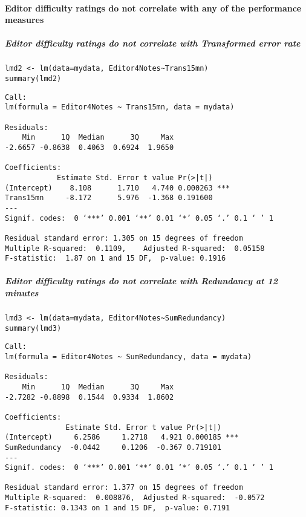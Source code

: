 \documentclass[10pt]{article}
\begin{document}
\paragraph*{Editor difficulty ratings do not correlate with any of the performance measures}
\label{sec-2-2-3-2}

\subparagraph*{Editor difficulty ratings do not correlate with Transformed error rate}
\label{sec-2-2-3-2-1}

\begin{verbatim}
lmd2 <- lm(data=mydata, Editor4Notes~Trans15mn)
summary(lmd2)
\end{verbatim}

\begin{verbatim}
Call:
lm(formula = Editor4Notes ~ Trans15mn, data = mydata)

Residuals:
    Min      1Q  Median      3Q     Max 
-2.6657 -0.8638  0.4063  0.6924  1.9650 

Coefficients:
            Estimate Std. Error t value Pr(>|t|)    
(Intercept)    8.108      1.710   4.740 0.000263 ***
Trans15mn     -8.172      5.976  -1.368 0.191600    
---
Signif. codes:  0 ‘***’ 0.001 ‘**’ 0.01 ‘*’ 0.05 ‘.’ 0.1 ‘ ’ 1

Residual standard error: 1.305 on 15 degrees of freedom
Multiple R-squared:  0.1109,	Adjusted R-squared:  0.05158 
F-statistic:  1.87 on 1 and 15 DF,  p-value: 0.1916
\end{verbatim}


\subparagraph*{Editor difficulty ratings do not correlate with Redundancy at 12 minutes}
\label{sec-2-2-3-2-2}

\begin{verbatim}
lmd3 <- lm(data=mydata, Editor4Notes~SumRedundancy)
summary(lmd3)
\end{verbatim}

\begin{verbatim}
Call:
lm(formula = Editor4Notes ~ SumRedundancy, data = mydata)

Residuals:
    Min      1Q  Median      3Q     Max 
-2.7282 -0.8898  0.1544  0.9334  1.8602 

Coefficients:
              Estimate Std. Error t value Pr(>|t|)    
(Intercept)     6.2586     1.2718   4.921 0.000185 ***
SumRedundancy  -0.0442     0.1206  -0.367 0.719101    
---
Signif. codes:  0 ‘***’ 0.001 ‘**’ 0.01 ‘*’ 0.05 ‘.’ 0.1 ‘ ’ 1

Residual standard error: 1.377 on 15 degrees of freedom
Multiple R-squared:  0.008876,	Adjusted R-squared:  -0.0572 
F-statistic: 0.1343 on 1 and 15 DF,  p-value: 0.7191
\end{verbatim}
\end{document}
